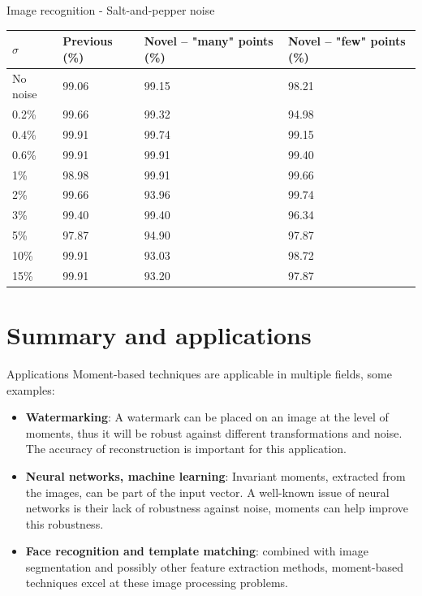 \documentclass{beamer}
\begin{document}
\begin{frame}{Image recognition - Salt-and-pepper noise}
    \vskip 1cm
    \begin{table}[tbp]
        \centering
        \begin{tabular}{|p{1.5cm}|p{2.2cm}|p{2.7cm}|p{2.5cm}|} \hline
            $\sigma$ & \textbf{Previous} (\%) & \textbf{Novel} -- "many" points (\%)& \textbf{Novel} -- "few" points (\%) \\ \hline\hline
            No noise & 99.06 & 99.15 & 98.21 \\ \hline
            0.2\% & 99.66 & 99.32 & 94.98 \\ \hline
            0.4\% & 99.91 & 99.74 & 99.15 \\ \hline
            0.6\% & 99.91 & 99.91 & 99.40 \\ \hline
            1\% & 98.98 & 99.91 & 99.66 \\ \hline
            2\% & 99.66 & 93.96 & 99.74 \\ \hline
            3\% & 99.40 & 99.40 & 96.34 \\ \hline
            5\% & 97.87 & 94.90 & 97.87 \\ \hline
            10\% & 99.91 & 93.03 & 98.72 \\ \hline
            15\% & 99.91 & 93.20 & 97.87 \\ \hline
        \end{tabular}
    \end{table}
\end{frame}

\section{Summary and applications}
\begin{frame}{Applications}
\vskip 5mm
    Moment-based techniques are applicable in multiple fields, some examples:
    \begin{itemize}
    \item \textbf{Watermarking}: 
    A watermark can be placed on an image at the level of moments, thus it will be robust against different transformations and noise. The accuracy of reconstruction is important for this application.
    \item \textbf{Neural networks, machine learning}: 
    Invariant moments, extracted from the images, can be part of the input vector. A well-known issue of neural networks is their lack of robustness against noise, moments can help improve this robustness.
    \item \textbf{Face recognition and template matching}: combined with image segmentation and possibly other feature extraction methods, moment-based techniques excel at these image processing problems.
    \end{itemize}
\end{frame}
\end{document}
